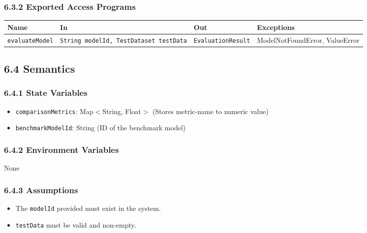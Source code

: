 \documentclass[12pt, titlepage]{article}
\begin{document}
\subsubsection{6.3.2 Exported Access Programs}
\begin{center}
\begin{tabular}{p{3.5cm} p{4.5cm} p{4cm} p{3cm}}
\hline
\textbf{Name} & \textbf{In} & \textbf{Out} & \textbf{Exceptions} \\
\hline
\texttt{evaluateModel} & \texttt{String modelId, TestDataset testData} & \texttt{EvaluationResult} & ModelNotFoundError, ValueError \\
\hline
\end{tabular}
\end{center}

\subsection{6.4 Semantics}

\subsubsection{6.4.1 State Variables}
\begin{itemize}
    \item \texttt{comparisonMetrics}: Map$<$String, Float$>$ (Stores metric-name to numeric value)
    \item \texttt{benchmarkModelId}: String (ID of the benchmark model)
\end{itemize}

\subsubsection{6.4.2 Environment Variables}
None

\subsubsection{6.4.3 Assumptions}
\begin{itemize}
    \item The \texttt{modelId} provided must exist in the system.
    \item \texttt{testData} must be valid and non-empty.
\end{itemize}
\end{document}
